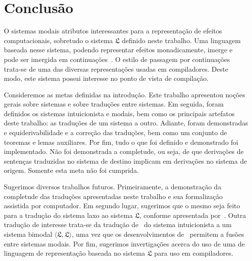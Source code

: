 \chapter{Conclusão}
    O sistemas modais atributos interessantes para a representação de efeitos computacionais, sobretudo o sistema $\mathfrak{L}$ definido neste trabalho.
    Uma linguagem baseada nesse sistema, podendo representar efeitos monadicamente, imerge e pode ser imergida em continuações~\citep{Filinski}.
    O estilo de passagem por continuações trata-se de uma das diversas representações usadas em compiladores.
    Deste modo, este sistema possui interesse no ponto de vista de compilação.

    \vspace{.3\baselineskip}
    Consideremos as metas definidas na introdução.
    Este trabalho apresentou noções gerais sobre sistemas e sobre traduções entre sistemas.
    Em seguida, foram definidos os sistemas intuicionista e modais, bem como os principais artefatos deste trabalho: as traduções de um sistema a outro.
    Adiante, foram demonstradas e equiderivabilidade e a correção das traduções, bem como um conjunto de teoremas e lemas auxiliares.
    Por fim, tudo o que foi definido e demonstrado foi implementado.
    Não foi demonstrada a completude, ou seja, de que derivações de sentenças traduzidas no sistema de destino implicam em derivações no sistema de origem.
    Somente esta meta não foi cumprida.

    \vspace{.3\baselineskip}
    Sugerimos diversos trabalhos futuros. Primeiramente, a demonstração da completude das traduções apresentadas neste trabalho e sua formalização assistida por computador.
    Em segundo lugar, sugerimos que o mesmo seja feito para a tradução do sistema laxo ao sistema $\mathfrak{L}$, conforme apresentada por~\cite{Fairtlough}. 
    Outra tradução de interesse trata-se da tradução de~\cite{Pfenning} do sistema intuicionista a um sistema bimodal $\langle\mathfrak{L},\mathfrak{L}\rangle$, uma vez que os desenvolvimentos de~\cite{Nunes} permitem a fusões entre sistemas modais.
    Por fim, sugerimos invertigações acerca do uso de uma de linguagem de representação baseada no sistema $\mathfrak{L}$ para uso em compiladores.

